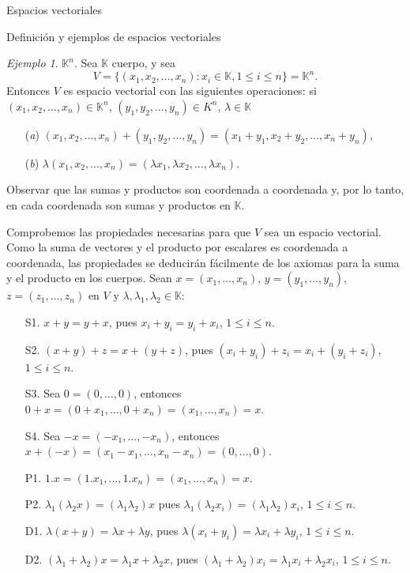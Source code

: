 \documentclass[a4paper,12pt,twoside,spanish,reqno]{amsbook}
\numberwithin{equation}{section}
\theoremstyle{definition}
\theoremstyle{remark}
\newtheorem*{ejemplo*}{Ejemplo}
\newcommand{\K}{\mathbb K}
\begin{document}
\begin{chapter}{Espacios vectoriales}
\begin{section}{Definición y ejemplos de espacios vectoriales}
            \begin{ejemplo*} {\sc $\K^n$.} Sea $\K$ cuerpo, y sea
                \begin{equation*}
                V = \{(x_1,x_2,\ldots,x_n): x_i \in \K, 1 \le i \le n \} = \K^n.
                \end{equation*}	
                Entonces $V$ es espacio vectorial con las siguientes operaciones: si $(x_1,x_2,\ldots,x_n) \in \K^n$, $(y_1,y_2,\ldots,y_n) \in K^n$, $\lambda \in \K$
                \begin{enumerate}
                    \item[(\textit{a})] $(x_1,x_2,\ldots,x_n)+ (y_1,y_2,\ldots,y_n) = (x_1+y_1,x_2+y_2,\ldots,x_n+y_n)$,
                    \item[(\textit{b})] $\lambda(x_1,x_2,\ldots,x_n) = (\lambda x_1,\lambda x_2,\ldots,\lambda x_n)$.
                \end{enumerate}
                Observar que las sumas y productos son coordenada a coordenada y, por lo tanto, en cada coordenada son sumas y productos en $\K$.
                
                Comprobemos las propiedades necesarias para que $V$ sea un espacio vectorial. Como la suma de vectores y el producto por escalares es coordenada a coordenada, las propiedades se deducirán fácilmente de los axiomas para la suma y el producto en los cuerpos.  Sean $x =  (x_1,\ldots,x_n)$, $y = (y_1,\ldots,y_n)$, $z = (z_1,\ldots,z_n)$ en $V$ y $\lambda, \lambda_1,\lambda_2 \in \K$:
                \begin{enumerate}
                    \item[S1.] $x + y = y +x$, pues $x_i + y_i = y_i + x_i$, $1 \le i \le n$.
                    \item[S2.]  $(x+ y)+ z = x + (y+z)$,  pues $(x_i + y_i) + z_i = x_i + (y_i + z_i)$, $1 \le i \le n$. 
                    \item[S3.] Sea $0 = (0,\ldots,0)$,  entonces $0+x = (0+x_1,\ldots, 0+x_n) =(x_1,\ldots,x_n) =x$.
                    \item[S4.] Sea $-x = (-x_1,\ldots,-x_n)$,  entonces $x + (-x) = (x_1-x_1,\ldots,x_n-x_n) =  (0,\ldots,0)$.
                    \item[P1.] $1.x=(1.x_1,\ldots,1.x_n) = (x_1,\ldots,x_n)=x$.
                    \item[P2.] $\lambda_1(\lambda_2x) = (\lambda_1\lambda_2)x$ pues $\lambda_1(\lambda_2x_i) =(\lambda_1\lambda_2)x_i$, $1 \le i \le n$.
                    \item[D1.] $\lambda(x+y) = \lambda x +\lambda y$,  pues $\lambda(x_i+y_i) = \lambda x_i + \lambda y_i$, $1 \le i \le n$.
                    \item[D2.] $(\lambda_1+\lambda_2)x = \lambda_1x + \lambda_2 x$, pues $ (\lambda_1+\lambda_2)x_i = \lambda_1x_i + \lambda_2 x_i$, $1 \le i \le n$.
                \end{enumerate} 
                

\end{ejemplo*}
\end{section}
\end{chapter}
\end{document}
